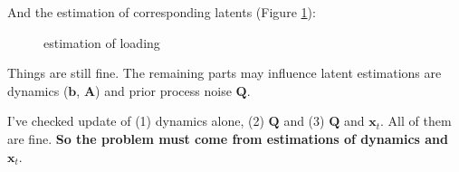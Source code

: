 \documentclass[]{article}
\begin{document}
And the estimation of corresponding latents (Figure \ref{loading and latents}):
\begin{figure}[h!]
	\caption{estimation of loading}
	\label{loading and latents}
\end{figure}

Things are still fine. The remaining parts may influence latent estimations are dynamics (\(\mathbf{b}\), \(\mathbf{A}\)) and prior process noise \(\mathbf{Q}\).

I've checked update of (1) dynamics alone, (2) \(\mathbf{Q}\) and (3) \(\mathbf{Q}\) and \(\mathbf{x}_{t}\). All of them are fine. \textbf{So the problem must come from estimations of dynamics and \(\mathbf{x}_t\)}.
\end{document}
